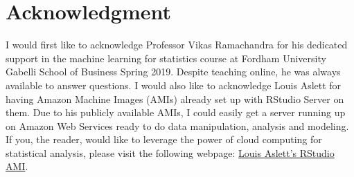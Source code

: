 \documentclass[journal, a4paper]{IEEEtran}
\begin{document}
\section{Acknowledgment} 
I would first like to acknowledge Professor Vikas Ramachandra for his dedicated support in the machine learning for statistics course at Fordham University Gabelli School of Business Spring 2019. Despite teaching online, he was always available to answer questions. I would also like to acknowledge Louis Aslett for having Amazon Machine Images (AMIs) already set up with RStudio Server on them. Due to his publicly available AMIs, I could easily get a server running up on Amazon Web Services ready to do data manipulation, analysis and modeling. If you, the reader, would like to leverage the power of cloud computing for statistical analysis, please visit the following webpage: \href{http://www.louisaslett.com/RStudio_AMI/}{Louis Aslett's RStudio AMI}.  
\end{document}
